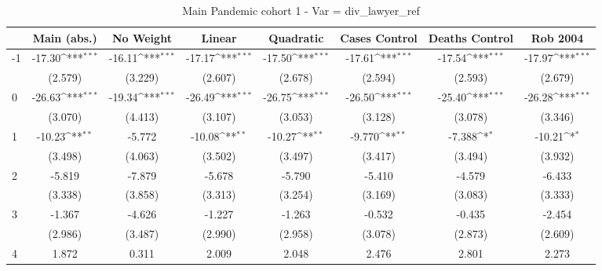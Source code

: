 \documentclass{article}
\begin{document}
{
\def\sym#1{\ifmmode^{#1}\else\(^{#1}\)\fi}
\begin{longtable}{l*{7}{c}}
\caption{Main Pandemic cohort 1 - Var = div\_lawyer\_ref}\\
\hline\hline\endfirsthead\hline\endhead\hline\endfoot\endlastfoot
                &\multicolumn{1}{c}{Main (abs.)}&\multicolumn{1}{c}{No Weight}&\multicolumn{1}{c}{Linear}&\multicolumn{1}{c}{Quadratic}&\multicolumn{1}{c}{Cases Control}&\multicolumn{1}{c}{Deaths Control}&\multicolumn{1}{c}{Rob 2004}\\
\hline
-1              &   -17.30\sym{***}&   -16.11\sym{***}&   -17.17\sym{***}&   -17.50\sym{***}&   -17.61\sym{***}&   -17.54\sym{***}&   -17.97\sym{***}\\
                &  (2.579)         &  (3.229)         &  (2.607)         &  (2.678)         &  (2.594)         &  (2.593)         &  (2.679)         \\
0               &   -26.63\sym{***}&   -19.34\sym{***}&   -26.49\sym{***}&   -26.75\sym{***}&   -26.50\sym{***}&   -25.40\sym{***}&   -26.28\sym{***}\\
                &  (3.070)         &  (4.413)         &  (3.107)         &  (3.053)         &  (3.128)         &  (3.078)         &  (3.346)         \\
1               &   -10.23\sym{**} &   -5.772         &   -10.08\sym{**} &   -10.27\sym{**} &   -9.770\sym{**} &   -7.388\sym{*}  &   -10.21\sym{*}  \\
                &  (3.498)         &  (4.063)         &  (3.502)         &  (3.497)         &  (3.417)         &  (3.494)         &  (3.932)         \\
2               &   -5.819         &   -7.879         &   -5.678         &   -5.790         &   -5.410         &   -4.579         &   -6.433         \\
                &  (3.338)         &  (3.858)         &  (3.313)         &  (3.254)         &  (3.169)         &  (3.083)         &  (3.333)         \\
3               &   -1.367         &   -4.626         &   -1.227         &   -1.263         &   -0.532         &   -0.435         &   -2.454         \\
                &  (2.986)         &  (3.487)         &  (2.990)         &  (2.958)         &  (3.078)         &  (2.873)         &  (2.609)         \\
4               &    1.872         &    0.311         &    2.009         &    2.048         &    2.476         &    2.801         &    2.273         \\

\end{longtable}}
\end{document}
